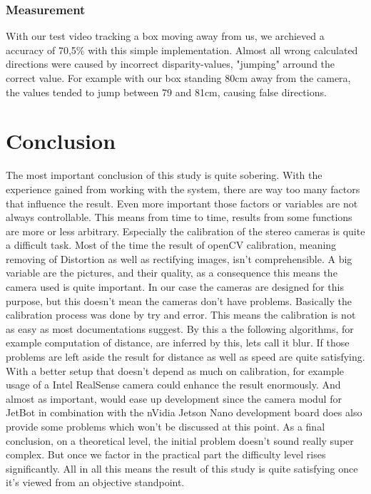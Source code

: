 \documentclass[journal,onecolumn]{IEEEtran}
\begin{document}
\subsubsection{Measurement}
\noindent With our test video tracking a box moving away from us, we archieved a accuracy of 70,5\% with this simple implementation. Almost all wrong calculated directions were caused by incorrect disparity-values, "jumping" arround the correct value. For example with our box standing 80cm away from the camera, the values tended to jump between 79 and 81cm, causing false directions. 
 

\section{Conclusion}
\noindent The most important conclusion of this study is quite sobering. With the experience gained from working with the system, there are way too many factors that influence the result. Even more important those factors or variables are not always controllable. This means from time to time, results from some functions are more or less arbitrary. Especially the calibration of the stereo cameras is quite a difficult task. Most of the time the result of openCV calibration, meaning removing of Distortion as well as rectifying images, isn't comprehensible. A big variable are the pictures, and their quality, as a consequence this means the camera used is quite important. In our case the cameras are designed for this purpose, but this doesn't mean the cameras don't have problems. Basically the calibration process was done by try and error. This means the calibration is not as easy as most documentations suggest. By this a the following algorithms, for example computation of distance, are inferred by this, lets call it blur. \newline
If those problems are left aside the result for distance as well as speed are quite satisfying. With a better setup that doesn't depend as much on calibration, for example usage of a Intel RealSense camera could enhance the result enormously. And almost as important, would ease up development since the camera modul for JetBot in combination with the nVidia Jetson Nano development board does also provide some problems which won't be discussed at this point. \newline
As a final conclusion, on a theoretical level, the initial problem doesn't sound really super complex. But once we factor in the practical part the difficulty level rises significantly. All in all this means the result of this study is quite satisfying once it's viewed from an objective standpoint.
\appendices
\end{document}
